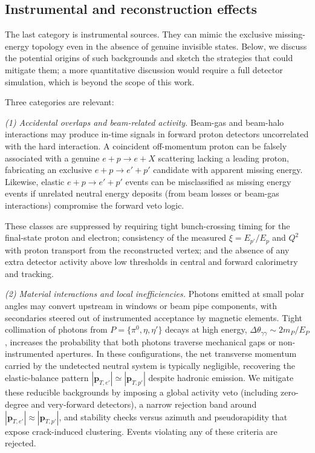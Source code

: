 \documentclass[aps,prd,preprintnumbers,superscriptaddress,nofootinbib,floatfix,twocolumn,notitlepage,reprint]{revtex4-2}
\begin{document}
\subsection{Instrumental and reconstruction effects} 
The last category is instrumental sources. 
They can mimic the exclusive missing-energy topology even in the absence of genuine invisible states. Below, we discuss the potential origins of such backgrounds and sketch the strategies that could mitigate them; a more quantitative discussion would require a full detector simulation, which is beyond the scope of this work.

Three categories are relevant:

\emph{(1) Accidental overlaps and beam-related activity.}  
Beam-gas and beam-halo interactions may produce in-time signals in forward proton detectors uncorrelated with the hard interaction.  
A coincident off-momentum proton can be falsely associated with a genuine $e+p\to e+X$ scattering lacking a leading proton, fabricating an exclusive $e+p\to e'+p'$ candidate with apparent missing energy. Likewise, elastic $e+p\to e'+p'$ events can be misclassified as missing energy events if unrelated neutral energy deposits (from beam losses or beam-gas interactions) compromise the forward veto logic. 

These classes are suppressed by requiring tight bunch-crossing timing for the final-state proton and electron; consistency of the measured $\xi = E_{p'}/E_{p}$ and $Q^2$ with proton transport from the reconstructed vertex; and the absence of any extra detector activity above low thresholds in central and forward calorimetry and tracking.

\emph{(2) Material interactions and local inefficiencies.}  
Photons emitted at small polar angles may convert upstream in windows or beam pipe components, with secondaries steered out of instrumented acceptance by magnetic elements.  
Tight collimation of photons from $P=\{\pi^0,\eta,\eta'\}$ decays at high energy, $\Delta\theta_{\gamma\gamma}\sim 2m_P/E_P$, increases the probability that both photons traverse mechanical gaps or non-instrumented apertures.  
In these configurations, the net transverse momentum carried by the undetected neutral system is typically negligible, 
recovering the elastic-balance pattern $|\mathbf p_{T,e'}|\simeq|\mathbf p_{T,p'}|$ despite hadronic emission.  
We mitigate these reducible backgrounds by imposing a global activity veto (including zero-degree and very-forward detectors), a narrow rejection band around $|\mathbf p_{T,e'}|\approx|\mathbf p_{T,p'}|$, and stability checks versus azimuth and pseudorapidity that expose crack-induced clustering.  
Events violating any of these criteria are rejected.
\end{document}
